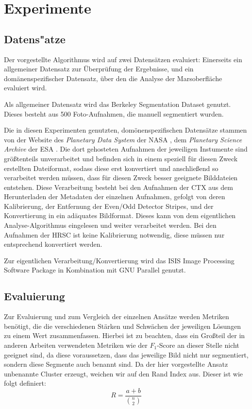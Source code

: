 \chapter{Experimente}
\label{chap:experimente}

\section{Datens"atze}
\label{sec:datensätze}

Der vorgestellte Algorithmus wird auf zwei Datensätzen evaluiert: Einerseits ein allgemeiner Datensatz zur Überprüfung der Ergebnisse, und ein domänenspezifischer Datensatz, über den die Analyse der Marsoberfläche evaluiert wird. 

Als allgemeiner Datensatz wird das Berkeley Segmentation Dataset \cite{bsd500} genutzt. Dieses besteht aus 500 Foto-Aufnahmen, die manuell segmentiert wurden.

Die in diesen Experimenten genutzten, domönenspezifischen Datensätze stammen von der Website des \textit{Planetary Data System} der NASA \cite{pds}, \bzw dem \textit{Planetary Science Archive} der ESA \cite{psa}. Die dort gehosteten Aufnahmen der jeweiligen Instumente sind größtenteils unverarbeitet und befinden sich in einem speziell für diesen Zweck erstellten Dateiformat, sodass diese erst konvertiert und anschließend so verarbeitet werden müssen, dass für diesen Zweck besser geeignete Bilddateien entstehen.
Diese Verarbeitung besteht bei den Aufnahmen der CTX aus dem Herunterladen der Metadaten der einzelnen Aufnahmen, gefolgt von deren Kalibrierung, der Entfernung der Even/Odd Detector Stripes, und der Konvertierung in ein adäquates Bildformat. Dieses kann von dem eigentlichen Analyse-Algorithmus eingelesen und weiter verarbeitet werden. Bei den Aufnahmen der HRSC ist keine Kalibrierung notwendig, diese müssen nur entsprechend konvertiert werden.

Zur eigentlichen Verarbeitung/Konvertierung wird das ISIS Image Processing Software Package \cite{isis} in Kombination mit GNU Parallel \cite{gnuparallel} genutzt.

\section{Evaluierung}
\label{sec:evaluierung}

Zur Evaluierung und zum Vergleich der einzelnen Ansätze werden Metriken benötigt, die die verschiedenen Stärken und Schwächen der jeweiligen Lösungen zu einem Wert zusammenfassen. Hierbei ist zu beachten, dass ein Großteil der in anderen Arbeiten verwendeten Metriken wie \bspw der $F_1$-Score an dieser Stelle nicht geeignet sind, da diese voraussetzen, dass das jeweilige Bild nicht nur segmentiert, sondern diese Segmente auch benannt sind. Da der hier vorgestellte Ansatz unbenannte Cluster erzeugt, weichen wir auf den Rand Index\cite{randindex} aus. Dieser ist wie folgt definiert:
\[R=\frac{a+b}{\binom{n}{2}}\]

